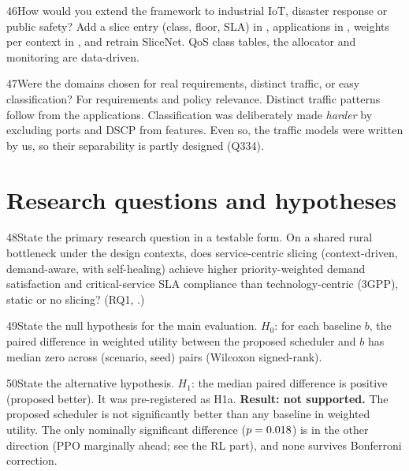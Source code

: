 \begin{qa}{46}{How would you extend the framework to industrial IoT, disaster response or public safety?}
Add a slice entry (class, floor, SLA) in , applications in , weights per
context in , and retrain SliceNet. QoS class tables, the allocator and monitoring are data-driven.
\end{qa}

\begin{qa}{47}{Were the domains chosen for real requirements, distinct traffic, or easy classification?}
For requirements and policy relevance. Distinct traffic patterns follow from the applications. Classification was
deliberately made \emph{harder} by excluding ports and DSCP from features. Even so, the traffic models were written
by us, so their separability is partly designed (Q334).
\end{qa}

\section{Research questions and hypotheses}

\begin{qa}{48}{State the primary research question in a testable form.}
On a shared rural bottleneck under the design contexts, does service-centric slicing (context-driven, demand-aware,
with self-healing) achieve higher priority-weighted demand satisfaction and critical-service SLA compliance than
technology-centric (3GPP), static or no slicing? (RQ1, .)
\end{qa}

\begin{qa}{49}{State the null hypothesis for the main evaluation.}
$H_0$: for each baseline $b$, the paired difference in weighted utility between the proposed scheduler and $b$ has
median zero across (scenario, seed) pairs (Wilcoxon signed-rank).
\end{qa}

\begin{qa}{50}{State the alternative hypothesis.}
$H_1$: the median paired difference is positive (proposed better). It was pre-registered as H1a.
\textbf{Result: not supported.} The proposed scheduler is not significantly better than any baseline in weighted
utility. The only nominally significant difference ($p=0.018$) is in the other direction (PPO marginally ahead; see the RL part),
and none survives Bonferroni correction.
\end{qa}

